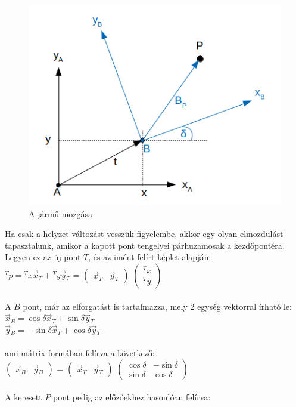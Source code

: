 \begin{figure}[h!]
\centering
\includegraphics[scale=0.70]{images/A_to_B_point.png}
\caption{A jármű mozgása}
\label{fig:a_to_b_point}
\end{figure}

\newpage

Ha csak a helyzet változást vesszük figyelembe, akkor egy olyan elmozdulást tapasztalunk, amikor a kapott pont tengelyei párhuzamosak a kezdőpontéra. Legyen ez az új pont $ T $, és az imént felírt képlet alapján:\\

$ {}^{T}p = {}^{T}x\vec{x}{}_{T} + {}^{T}y\vec{y}{}_{T} $  =
\(
\begin{pmatrix}
	\vec{x}{}_{T} & \vec{y}{}_{T}
\end{pmatrix}	 
\)
\(
\begin{pmatrix}
	{}^{T}x\\
	{}^{T}y
\end{pmatrix}	 
\)\\\\
A $ B $ pont, már az elforgatást is tartalmazza, mely 2 egység vektorral írható le:\\

$ \vec{x}{}_{B} = \cos\delta\vec{x}{}_{T} + \sin\delta\vec{y}{}_{T} $\\

$ \vec{y}{}_{B} = -\sin\delta\vec{x}{}_{T} + \cos\delta\vec{y}{}_{T} $\\\\
ami mátrix formában felírva a következő:\\

\(
\begin{pmatrix}
	\vec{x}{}_{B} & \vec{y}{}_{B}
\end{pmatrix}
\) =
\(
\begin{pmatrix}
	\vec{x}{}_{T} & \vec{y}{}_{T}
\end{pmatrix}
\)
\(
\begin{pmatrix}
	\cos\delta & -\sin\delta\\
	\sin\delta & \cos\delta
\end{pmatrix}
\)\\\\
A keresett $ P $ pont pedig az előzőekhez hasonlóan felírva:\\

